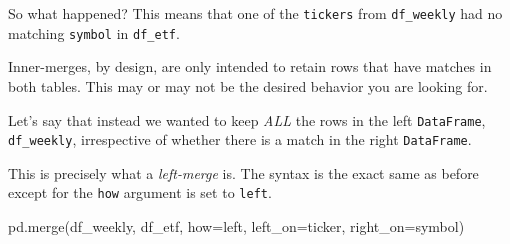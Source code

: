 \documentclass[
  letterpaper,
  DIV=11,
  numbers=noendperiod]{scrreprt}
\newenvironment{Shaded}{\begin{snugshade}}{\end{snugshade}}
\newcommand{\NormalTok}[1]{\textcolor[rgb]{0.00,0.23,0.31}{#1}}
\newcommand{\OperatorTok}[1]{\textcolor[rgb]{0.37,0.37,0.37}{#1}}
\newcommand{\StringTok}[1]{\textcolor[rgb]{0.13,0.47,0.30}{#1}}
\begin{document}
So what happened? This means that one of the \texttt{tickers} from
\texttt{df\_weekly} had no matching \texttt{symbol} in \texttt{df\_etf}.

Inner-merges, by design, are only intended to retain rows that have
matches in both tables. This may or may not be the desired behavior you
are looking for.

Let's say that instead we wanted to keep \emph{ALL} the rows in the left
\texttt{DataFrame}, \texttt{df\_weekly}, irrespective of whether there
is a match in the right \texttt{DataFrame}.

This is precisely what a \emph{left-merge} is. The syntax is the exact
same as before except for the \texttt{how} argument is set to
\texttt{\textquotesingle{}left\textquotesingle{}}.

\begin{Shaded}
\begin{Highlighting}[]
\NormalTok{pd.merge(df\_weekly, df\_etf, how}\OperatorTok{=}\StringTok{\textquotesingle{}left\textquotesingle{}}\NormalTok{, left\_on}\OperatorTok{=}\StringTok{\textquotesingle{}ticker\textquotesingle{}}\NormalTok{, right\_on}\OperatorTok{=}\StringTok{\textquotesingle{}symbol\textquotesingle{}}\NormalTok{)}
\end{Highlighting}
\end{Shaded}
\end{document}
